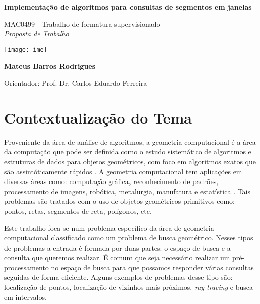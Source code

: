 \documentclass[10pt,twoside,a4paper]{article}
\begin{document}
\begin{center}
  \vspace*{3cm}
  
  \Huge
  \textbf{Implementação de algoritmos para consultas de segmentos em janelas}

  \vspace{2.5cm}
  \LARGE
  MAC0499 - Trabalho de formatura supervisionado\\
  \vspace{0.3cm}
  \LARGE
  \textit{Proposta de Trabalho}

  
  \vspace{4.3cm}
  \texttt{[image: ime]}
  \vspace{2cm}
  
  \textbf{Mateus Barros Rodrigues}
  
  \vfill
  
  Orientador: Prof. Dr. Carlos Eduardo Ferreira
  
  \vspace{0.8cm}
  
  \Large
  
\end{center}




\newpage
\tableofcontents
\newpage
\section{Contextualização do Tema}
Proveniente da área de análise de algoritmos, a geometria computacional é a área da computação que pode ser definida como o estudo sistemático de algoritmos e estruturas de dados para objetos geométricos, com foco em algoritmos exatos que são assintóticamente rápidos \cite{dbvkos}. A geometria computacional tem aplicações em diversas áreas como: computação gráfica, reconhecimento de padrões, processamento de imagens, robótica, metalurgia, manufatura e estatística \cite{cormen}. Tais problemas são tratados com o uso de objetos geométricos primitivos como: pontos, retas, segmentos de reta, polígonos, etc.\par
Este trabalho foca-se num problema específico da área de geometria computacional classificado como um problema de busca geométrico. Nesses tipos de problemas a entrada é formada por duas partes: o espaço de busca e a consulta que queremos realizar. É comum que seja necessário realizar um pré-processamento no espaço de busca para que possamos responder várias consultas seguidas de forma eficiente. Alguns exemplos de problemas desse tipo são: localização de pontos, localização de vizinhos mais próximos, \textit{ray tracing} e busca em intervalos.
\end{document}
